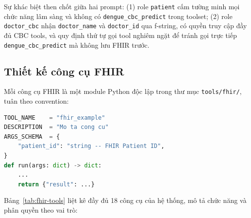 \documentclass[oneside, a4paper]{book}
\theoremstyle{plain}
\theoremstyle{plain}
\theoremstyle{definition}
\theoremstyle{remark}
\begin{document}
Sự khác biệt then chốt giữa hai prompt: (1) role \texttt{patient} cấm tường minh mọi chức năng lâm sàng và không có \texttt{dengue\_cbc\_predict} trong toolset; (2) role \texttt{doctor\_cbc} nhận \texttt{doctor\_name} và \texttt{doctor\_id} qua f-string, có quyền truy cập đầy đủ CBC tools, và quy định thứ tự gọi tool nghiêm ngặt để tránh gọi trực tiếp \texttt{dengue\_cbc\_predict} mà không lưu FHIR trước.

\subsection{Thiết kế công cụ FHIR}

Mỗi công cụ FHIR là một module Python độc lập trong thư mục \texttt{tools/fhir/}, tuân theo convention:

\begin{lstlisting}[language=Python, caption={Convention định nghĩa công cụ FHIR}]
TOOL_NAME    = "fhir_example"
DESCRIPTION  = "Mo ta cong cu"
ARGS_SCHEMA  = {
    "patient_id": "string -- FHIR Patient ID",
}
def run(args: dict) -> dict:
    ...
    return {"result": ...}
\end{lstlisting}

Bảng~\ref{tab:fhir-tools} liệt kê đầy đủ 18 công cụ của hệ thống, mô tả chức năng và phân quyền theo vai trò:
\end{document}
